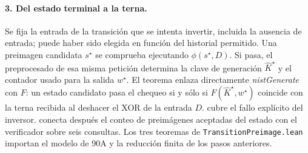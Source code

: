 \paragraph{3. Del estado terminal a la terna.}
Se fija la entrada de la transición que se intenta invertir, incluida la
ausencia de entrada; puede haber sido elegida en función del historial
permitido. Una preimagen candidata \(s^\star\) se comprueba ejecutando
\(\phi(s^\star,D)\). Si pasa, el preprocesado de esa misma petición
determina la clave de generación \(\widehat K^\star\) y el contador usado
para la salida \(w^\star\). El teorema  enlaza
directamente \emph{nistGenerate} con \(F\): un estado candidato pasa el chequeo
si y sólo si \(F(\widehat K^\star,w^\star)\) coincide con la terna recibida
al deshacer el XOR de la entrada \(D\). 
cubre el fallo explícito del inversor. 
conecta después el conteo de preimágenes aceptadas del estado con el verificador
sobre seis consultas. Los tres teoremas de \texttt{TransitionPreimage.lean}
importan el modelo de 90A y la reducción finita de los pasos anteriores.

